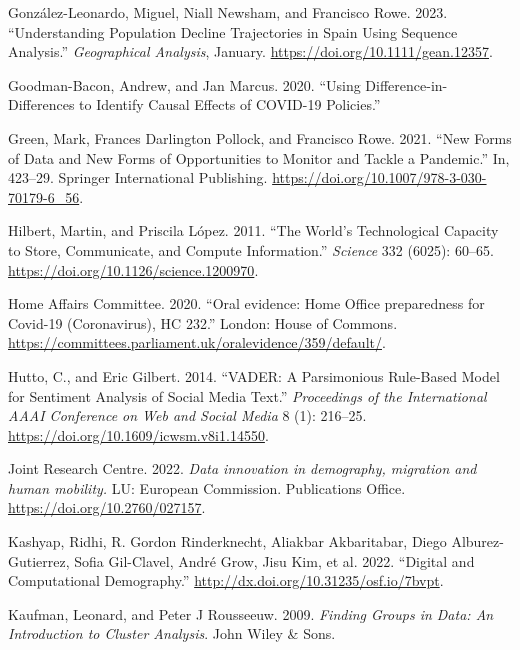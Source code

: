 \documentclass[
  letterpaper,
  DIV=11,
  numbers=noendperiod]{scrreprt}
\newlength{\cslhangindent}
\newlength{\cslentryspacingunit} %
\newenvironment{CSLReferences}[2] %
 {%
  \setlength{\parindent}{0pt}
  \ifodd #1
  \let\oldpar\par
  \def\par{\hangindent=\cslhangindent\oldpar}
  \fi
  \setlength{\parskip}{#2\cslentryspacingunit}
 }%
 {}
\begin{document}
\begin{CSLReferences}{1}{0}
\leavevmode{}%
González-Leonardo, Miguel, Niall Newsham, and Francisco Rowe. 2023.
{``Understanding Population Decline Trajectories in Spain Using Sequence
Analysis.''} \emph{Geographical Analysis}, January.
\url{https://doi.org/10.1111/gean.12357}.

\leavevmode{}%
Goodman-Bacon, Andrew, and Jan Marcus. 2020. {``Using
Difference-in-Differences to Identify Causal Effects of COVID-19
Policies.''}

\leavevmode{}%
Green, Mark, Frances Darlington Pollock, and Francisco Rowe. 2021.
{``New Forms of Data and New Forms of Opportunities to Monitor and
Tackle a Pandemic.''} In, 423--29. Springer International Publishing.
\url{https://doi.org/10.1007/978-3-030-70179-6_56}.

\leavevmode{}%
Hilbert, Martin, and Priscila López. 2011. {``The World{'}s
Technological Capacity to Store, Communicate, and Compute
Information.''} \emph{Science} 332 (6025): 60--65.
\url{https://doi.org/10.1126/science.1200970}.

\leavevmode{}%
Home Affairs Committee. 2020. {``{Oral evidence: Home Office
preparedness for Covid-19 (Coronavirus), HC 232}.''} London: House of
Commons.
\url{https://committees.parliament.uk/oralevidence/359/default/}.

\leavevmode{}%
Hutto, C., and Eric Gilbert. 2014. {``VADER: A Parsimonious Rule-Based
Model for Sentiment Analysis of Social Media Text.''} \emph{Proceedings
of the International AAAI Conference on Web and Social Media} 8 (1):
216--25. \url{https://doi.org/10.1609/icwsm.v8i1.14550}.

\leavevmode{}%
Joint Research Centre. 2022. \emph{Data innovation in demography,
migration and human mobility.} LU: European Commission. Publications
Office. \url{https://doi.org/10.2760/027157}.

\leavevmode{}%
Kashyap, Ridhi, R. Gordon Rinderknecht, Aliakbar Akbaritabar, Diego
Alburez-Gutierrez, Sofia Gil-Clavel, André Grow, Jisu Kim, et al. 2022.
{``Digital and Computational Demography.''}
\url{http://dx.doi.org/10.31235/osf.io/7bvpt}.

\leavevmode{}%
Kaufman, Leonard, and Peter J Rousseeuw. 2009. \emph{Finding Groups in
Data: An Introduction to Cluster Analysis}. John Wiley \& Sons.


\end{CSLReferences}
\end{document}
